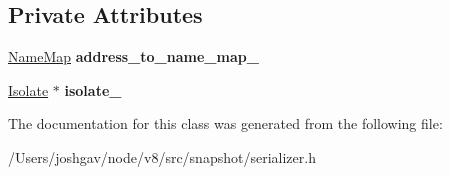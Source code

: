 \subsection*{Private Attributes}
\begin{DoxyCompactItemize}
\item 
\hyperlink{classv8_1_1internal_1_1_code_address_map_1_1_name_map}{Name\+Map} {\bfseries address\+\_\+to\+\_\+name\+\_\+map\+\_\+}\hypertarget{classv8_1_1internal_1_1_code_address_map_a8a76e8f14f482f0c8f845daa5e41773b}{}\label{classv8_1_1internal_1_1_code_address_map_a8a76e8f14f482f0c8f845daa5e41773b}

\item 
\hyperlink{classv8_1_1internal_1_1_isolate}{Isolate} $\ast$ {\bfseries isolate\+\_\+}\hypertarget{classv8_1_1internal_1_1_code_address_map_a9303b09a7580aa4e25346807e8578569}{}\label{classv8_1_1internal_1_1_code_address_map_a9303b09a7580aa4e25346807e8578569}

\end{DoxyCompactItemize}


The documentation for this class was generated from the following file\+:\begin{DoxyCompactItemize}
\item 
/\+Users/joshgav/node/v8/src/snapshot/serializer.\+h\end{DoxyCompactItemize}
